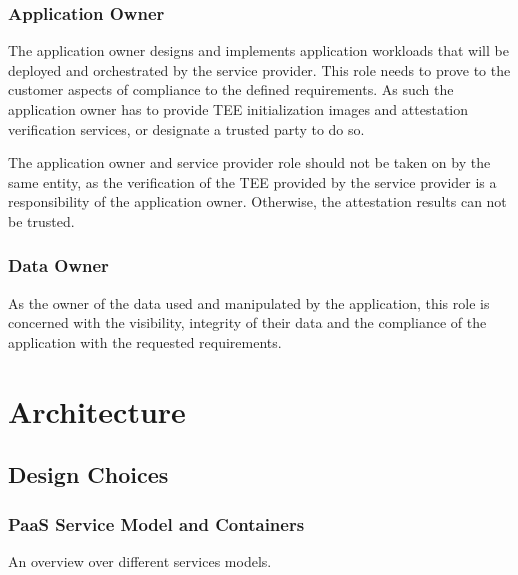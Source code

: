 \subsubsection*{Application Owner}

The application owner designs and implements application workloads that will be
deployed and orchestrated by the service provider. This role needs to prove to
the customer aspects of compliance to the defined requirements. As such the
application owner has to provide TEE initialization images and attestation
verification services, or designate a trusted party to do so.

The application owner and service provider role should not be taken on by the
same entity, as the verification of the TEE provided by the service provider is
a responsibility of the application owner. Otherwise, the attestation results
can not be trusted.

\subsubsection*{Data Owner}

As the owner of the data used and manipulated by the application, this role is
concerned with the visibility, integrity of their data and the compliance of the
application with the requested requirements.

\section{Architecture}
\label{sec:proposal:architecture}

\subsection{Design Choices}

\subsubsection*{PaaS Service Model and Containers}

\begin{table}
  \centering
  \footnotesize
  \scalebox{0.9}{}
  \caption{An overview over different services models.}
  \label{table:service-models}
\end{table}


